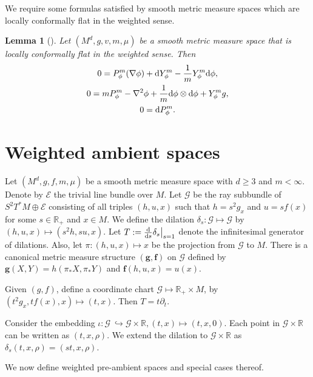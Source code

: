 \documentclass[10pt,a4paper]{amsart}
\newcommand{\mG}{\mathcal{G}}
\newcommand{\bR}{\mathbb{R}}
\numberwithin{equation}{section}
\newtheorem{Lemma}[Theorem]{Lemma}
\begin{document}
We require some formulas satisfied by smooth metric measure spaces which are locally conformally flat in the weighted sense.
\begin{Lemma}[{\cite[Lemma~3.2]{Case2014s}}]
\label{locally-conformally-flat-implications}
Let $(M^{d}, g, v, m, \mu)$ be a smooth metric measure space that is locally conformally flat in the weighted sense. Then
\begin{subequations}
\begin{gather}
0=P_{\phi}^{m}(\nabla \phi)+{\rm d}Y_{\phi}^{m}-\frac{1}{m} Y_{\phi}^{m} {\rm d}\phi,
\\
\label{second-condition-locally-conformally-flat}
0=m P_{\phi}^{m}-\nabla^{2} \phi+\frac{1}{m} {\rm d}\phi \otimes {\rm d}\phi+ Y_{\phi}^{m} g,
\\
0={\rm d} P_{\phi}^{m}.
\end{gather}
\end{subequations}
\end{Lemma}


\section{Weighted ambient spaces}
\label{sec:fg}

Let $(M^d,g,f,m,\mu)$ be a smooth metric measure space with $d\geq 3$ and $m<\infty$. Denote by $\mathcal{E}$ the trivial line bundle over $M$. Let $\mathcal{G}$ be the ray subbundle of $S^2 T^*M\oplus \mathcal{E}$ consisting of all triples $(h,u,x)$ such that $h=s^2 g_x$ and $u=sf(x)$ for some $s\in \bR_+$ and $x\in M$. We define the dilation $\delta_s\colon \mG \mapsto \mG$ by $(h,u,x)\mapsto (s^2 h,su,x)$. Let $T:=\frac{{\rm d}}{{\rm d}s}\delta_s\big|_{s=1}$ denote the infinitesimal generator of dilations. Also, let $\pi \colon (h,u,x) \mapsto x$ be the projection from $\mG$ to $M$. There is a canonical metric measure structure $(\boldsymbol{g},\boldsymbol{f})$ on $\mG$ defined by $\boldsymbol{g}(X,Y)=h(\pi_*X,\pi_*Y)$ and $\boldsymbol{f}(h,u,x)=u(x)$.

Given $(g,f)$, define a coordinate chart $\mG\mapsto \bR_+\times M$, by $(t^2g_x,tf(x),x)\mapsto (t,x)$. Then $T=t\partial_t$.

Consider the embedding $\iota \colon \mG\ \hookrightarrow \mG\times\bR,(t,x)\mapsto (t,x,0)$. Each point in $\mG\times\bR$ can be written as $(t,x,\rho)$. We extend the dilation to $\mathcal{G}\times \bR$ as $\delta_s (t,x,\rho)= (st,x,\rho)$.

We now define weighted pre-ambient spaces and special cases thereof.
\end{document}
